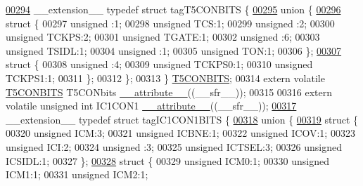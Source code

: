 \begin{DoxyCode}
\hypertarget{a00009_source_l00294}{}\hyperlink{a00008}{00294} \_\_extension\_\_ \textcolor{keyword}{typedef} \textcolor{keyword}{struct }tagT5CONBITS \{
\hypertarget{a00009_source_l00295}{}\hyperlink{a00009}{00295}   \textcolor{keyword}{union }\{
\hypertarget{a00009_source_l00296}{}\hyperlink{a00009}{00296}     \textcolor{keyword}{struct }\{
00297       \textcolor{keywordtype}{unsigned} :1;
00298       \textcolor{keywordtype}{unsigned} TCS:1;
00299       \textcolor{keywordtype}{unsigned} :2;
00300       \textcolor{keywordtype}{unsigned} TCKPS:2;
00301       \textcolor{keywordtype}{unsigned} TGATE:1;
00302       \textcolor{keywordtype}{unsigned} :6;
00303       \textcolor{keywordtype}{unsigned} TSIDL:1;
00304       \textcolor{keywordtype}{unsigned} :1;
00305       \textcolor{keywordtype}{unsigned} TON:1;
00306     \};
\hypertarget{a00009_source_l00307}{}\hyperlink{a00009}{00307}     \textcolor{keyword}{struct }\{
00308       \textcolor{keywordtype}{unsigned} :4;
00309       \textcolor{keywordtype}{unsigned} TCKPS0:1;
00310       \textcolor{keywordtype}{unsigned} TCKPS1:1;
00311     \};
00312   \};
00313 \} \hyperlink{a00008_df/d0e/a00800}{T5CONBITS};
00314 \textcolor{keyword}{extern} \textcolor{keyword}{volatile} \hyperlink{a00008_df/d0e/a00800}{T5CONBITS} T5CONbits \hyperlink{a00009_a493c46f03454991ccc5aa7a6e1dfb2a7}{\_\_attribute\_\_}((\_\_sfr\_\_));
00315 
00316 \textcolor{keyword}{extern} \textcolor{keyword}{volatile} \textcolor{keywordtype}{unsigned} \textcolor{keywordtype}{int}  IC1CON1 \hyperlink{a00009_a493c46f03454991ccc5aa7a6e1dfb2a7}{\_\_attribute\_\_}((\_\_sfr\_\_));
\hypertarget{a00009_source_l00317}{}\hyperlink{a00008}{00317} \_\_extension\_\_ \textcolor{keyword}{typedef} \textcolor{keyword}{struct }tagIC1CON1BITS \{
\hypertarget{a00009_source_l00318}{}\hyperlink{a00009}{00318}   \textcolor{keyword}{union }\{
\hypertarget{a00009_source_l00319}{}\hyperlink{a00009}{00319}     \textcolor{keyword}{struct }\{
00320       \textcolor{keywordtype}{unsigned} ICM:3;
00321       \textcolor{keywordtype}{unsigned} ICBNE:1;
00322       \textcolor{keywordtype}{unsigned} ICOV:1;
00323       \textcolor{keywordtype}{unsigned} ICI:2;
00324       \textcolor{keywordtype}{unsigned} :3;
00325       \textcolor{keywordtype}{unsigned} ICTSEL:3;
00326       \textcolor{keywordtype}{unsigned} ICSIDL:1;
00327     \};
\hypertarget{a00009_source_l00328}{}\hyperlink{a00009}{00328}     \textcolor{keyword}{struct }\{
00329       \textcolor{keywordtype}{unsigned} ICM0:1;
00330       \textcolor{keywordtype}{unsigned} ICM1:1;
00331       \textcolor{keywordtype}{unsigned} ICM2:1;

\end{DoxyCode}
